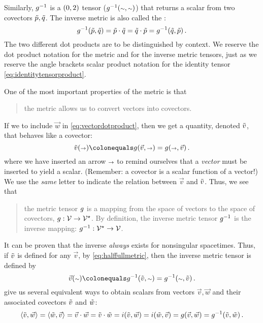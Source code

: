 Similarly, $g^{-1}$ is a $\torder 02$ tensor ($\invmet\vat{\cslot,\cslot}$) that returns a scalar from two covectors $\tilde{p},\tilde{q}$. The inverse metric is also called the :
%
\begin{equation}\label{eq:covectordotproduct}
  \invmet\vat{\cov p, \cov q} = \cov p\iprod\cov q
                              = \cov q\iprod\cov p
                              = \invmet\vat{\cov q,\cov p}\,.
\end{equation}
%
The two different dot products are to be distinguished by context. We reserve the dot product notation for the metric and for the inverse metric tensors, just as we reserve the angle brackets scalar product notation for the identity tensor \cref{eq:identitytensorproduct}.

One of the most important properties of the metric is that 
%
\begin{quotation}
  the metric allows us to convert vectors into covectors.
\end{quotation}
%
If we  to include $\vec w$ in \cref{eq:vectordotproduct}, then we get a quantity, denoted $\tilde{v}$, that behaves like a covector:
%
\begin{equation}\label{eq:halffullmetric}
  \cov v\vat\vslot \defas \metric\vat{\vec v,\vslot} 
                   = \metric\vat{\vslot,\vec v}\,.
\end{equation}
%
where we have inserted an arrow ${\scriptstyle\rightarrow}$ to remind ourselves that a \emph{vector} must be inserted to yield a scalar. (Remember: a covector is a scalar function of a vector!) We use the \emph{same} letter to indicate the relation between $\vec v$ and $\tilde{v}$. Thus, we see that
%
\begin{quotation}
  the metric tensor $g$ is a mapping from the space of vectors to the space of covectors, ${g}:{\mathcal{V}}\to{\mathcal{V}^\star}$. By definition, the inverse metric tensor $g^{-1}$ is the inverse mapping: ${g^{-1}}:{\mathcal{V}^\star}\to{\mathcal{V}}$.
\end{quotation}
%
It can be proven that the inverse \emph{always} exists for nonsingular spacetimes. Thus, if $\tilde{v}$ is defined for any $\vec v$, by \cref{eq:halffullmetric}, then the inverse metric tensor is defined by
%
\begin{equation}\label{eq:halffullinvmetric}
  \vec v\vat{\cslot} \defas \invmet\vat{\cov v, \cslot}
                      = \invmet\vat{\cslot,\cov v}\,.
\end{equation}
%
 give us several equivalent ways to obtain scalars from vectors $\vec v,\vec w$ and their associated covectors $\tilde{v}$ and $\tilde{w}$:
%
\begin{equation}
  \sprod{\cov v}{\vec w} = \sprod{\cov w}{ \vec v}
                         = \vec v\iprod\vec w
                         = \cov v\iprod\cov w
                         = \idtens\vat{\cov v, \vec w}
                         = \idtens\vat{\cov w, \vec v}
                         = \metric\vat{\vec v, \vec w}
                         = \invmet\vat{\cov v, \cov w}\,.
\end{equation}


